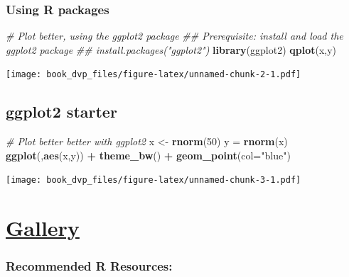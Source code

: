 \documentclass[
]{book}
\newenvironment{Shaded}{\begin{snugshade}}{\end{snugshade}}
\newcommand{\CommentTok}[1]{\textcolor[rgb]{0.56,0.35,0.01}{\textit{#1}}}
\newcommand{\DataTypeTok}[1]{\textcolor[rgb]{0.13,0.29,0.53}{#1}}
\newcommand{\DecValTok}[1]{\textcolor[rgb]{0.00,0.00,0.81}{#1}}
\newcommand{\KeywordTok}[1]{\textcolor[rgb]{0.13,0.29,0.53}{\textbf{#1}}}
\newcommand{\NormalTok}[1]{#1}
\newcommand{\OperatorTok}[1]{\textcolor[rgb]{0.81,0.36,0.00}{\textbf{#1}}}
\newcommand{\StringTok}[1]{\textcolor[rgb]{0.31,0.60,0.02}{#1}}
\begin{document}
\hypertarget{using-r-packages}{%
\subsubsection{Using R packages}\label{using-r-packages}}

\begin{Shaded}
\begin{Highlighting}[]
\CommentTok{# Plot better, using the ggplot2 package }
\CommentTok{## Prerequisite: install and load the ggplot2 package}
\CommentTok{## install.packages("ggplot2")}
\KeywordTok{library}\NormalTok{(ggplot2)}
\KeywordTok{qplot}\NormalTok{(x,y)}
\end{Highlighting}
\end{Shaded}

\texttt{[image: book\_dvp\_files/figure-latex/unnamed-chunk-2-1.pdf]}

\hypertarget{ggplot2-starter}{%
\subsection{ggplot2 starter}\label{ggplot2-starter}}

\begin{Shaded}
\begin{Highlighting}[]
\CommentTok{# Plot better better with ggplot2}
\NormalTok{x <-}\StringTok{ }\KeywordTok{rnorm}\NormalTok{(}\DecValTok{50}\NormalTok{) }
\NormalTok{y =}\StringTok{ }\KeywordTok{rnorm}\NormalTok{(x)}
\KeywordTok{ggplot}\NormalTok{(,}\KeywordTok{aes}\NormalTok{(x,y)) }\OperatorTok{+}\StringTok{ }\KeywordTok{theme_bw}\NormalTok{() }\OperatorTok{+}\StringTok{ }\KeywordTok{geom_point}\NormalTok{(}\DataTypeTok{col=}\StringTok{"blue"}\NormalTok{)}
\end{Highlighting}
\end{Shaded}

\texttt{[image: book\_dvp\_files/figure-latex/unnamed-chunk-3-1.pdf]}

\hypertarget{gallery}{%
\section{\texorpdfstring{\href{https://karlho.github.io/}{Gallery}}{Gallery}}\label{gallery}}

\hypertarget{recommended-r-resources}{%
\subsubsection{Recommended R Resources:}\label{recommended-r-resources}}
\end{document}

